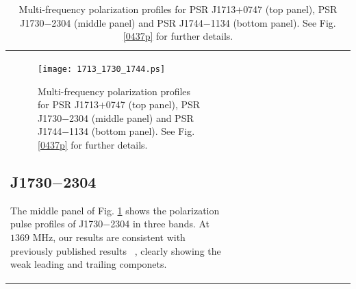 \documentclass[useAMS,usenatbib]{mn2e}
\begin{document}
\begin{table}
\begin{center}
\begin{tabular}{lcccccccccccc}

\begin{figure}
\begin{center}
\texttt{[image: 1713\_1730\_1744.ps]}
\caption{Multi-frequency polarization profiles for PSR J1713$+$0747 (top 
panel), PSR J1730$-$2304 (middle panel) and PSR J1744$-$1134 (bottom panel). 
See Fig. \ref{0437p} for further details.}
\label{1713p}
\end{center}
\end{figure}

\subsection{J1730$-$2304}

The middle panel of Fig. \ref{1713p} shows the polarization pulse profiles of J1730$-$2304 
in three bands.
%
At $1369$ MHz, our results are consistent with previously published results
~\citep{Ord04,Yan11}, clearly showing the weak leading and trailing componets.
%


%



\end{tabular}
\end{center}
\end{table}
\end{document}

